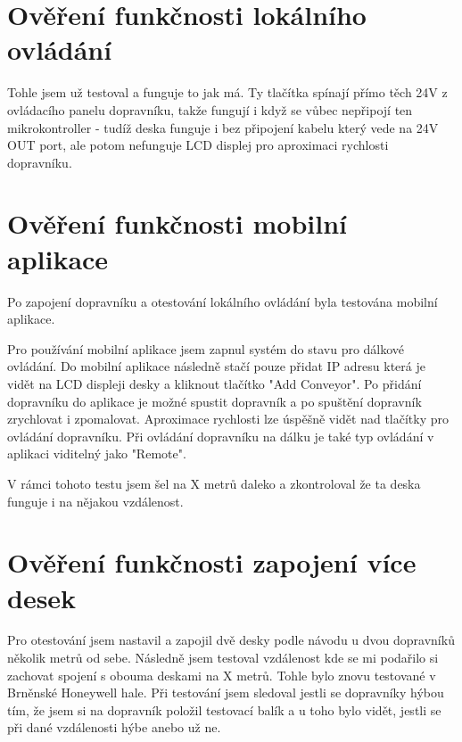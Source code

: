 \section{Ověření funkčnosti lokálního ovládání}

Tohle jsem už testoval a funguje to jak má. Ty tlačítka spínají přímo těch 24V z ovládacího panelu dopravníku, takže fungují i když se vůbec nepřipojí ten mikrokontroller - tudíž deska funguje i bez připojení kabelu který vede na 24V OUT port, ale potom nefunguje LCD displej pro aproximaci rychlosti dopravníku.

\section{Ověření funkčnosti mobilní aplikace}

Po zapojení dopravníku a otestování lokálního ovládání byla testována mobilní aplikace.

Pro používání mobilní aplikace jsem zapnul systém do stavu pro dálkové ovládání. Do mobilní aplikace následně stačí pouze přidat IP adresu která je vidět na LCD displeji desky a kliknout tlačítko "Add Conveyor". Po přidání dopravníku do aplikace je možné spustit dopravník a po spuštění dopravník zrychlovat i zpomalovat. Aproximace rychlosti lze úspěšně vidět nad tlačítky pro ovládání dopravníku. Při ovládání dopravníku na dálku je také typ ovládání v aplikaci viditelný jako "Remote".

V rámci tohoto testu jsem šel na X metrů daleko a zkontroloval že ta deska funguje i na nějakou vzdálenost.

\section{Ověření funkčnosti zapojení více desek}

Pro otestování jsem nastavil a zapojil dvě desky podle návodu u dvou dopravníků několik metrů od sebe. Následně jsem testoval vzdálenost kde se mi podařilo si zachovat spojení s obouma deskami na X metrů. Tohle bylo znovu testované v Brněnské Honeywell hale. Při testování jsem sledoval jestli se dopravníky hýbou tím, že jsem si na dopravník položil testovací balík a u toho bylo vidět, jestli se při dané vzdálenosti hýbe anebo už ne.

